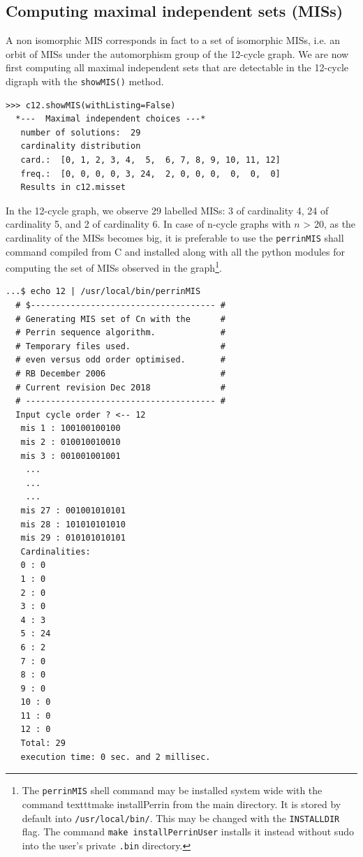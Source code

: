\subsection{Computing maximal independent sets (MISs)}
\label{sec:21.7.1}

A non isomorphic MIS corresponds in fact to a set of isomorphic MISs, i.e. an orbit of MISs under the automorphism group of the 12-cycle graph. We are now first computing all maximal independent sets that are detectable in the 12-cycle digraph with the \texttt{showMIS()} method.
\begin{lstlisting}
>>> c12.showMIS(withListing=False)
  *---  Maximal independent choices ---*
   number of solutions:  29
   cardinality distribution
   card.:  [0, 1, 2, 3, 4,  5,  6, 7, 8, 9, 10, 11, 12]
   freq.:  [0, 0, 0, 0, 3, 24,  2, 0, 0, 0,  0,  0,  0]
   Results in c12.misset
\end{lstlisting}
In the 12-cycle graph, we observe 29 labelled MISs: 3 of cardinality 4, 24 of cardinality 5, and 2  of cardinality 6. In case of n-cycle graphs with $n$ > 20, as the cardinality of the MISs becomes big, it is preferable to use the \texttt{perrinMIS} shall command compiled from C and installed  along with all the \Digraph python modules for computing the set of MISs observed in the graph\footnote{The \texttt{perrinMIS} shell command may be installed system wide with the command texttt{make installPerrin} from the main \Digraph directory. It is stored by default into \texttt{/usr/local/bin/}. This may be changed with the \texttt{INSTALLDIR} flag. The command \texttt{make installPerrinUser} installs it instead without sudo into the user's private \texttt{.bin} directory.}.
\begin{lstlisting}
...$ echo 12 | /usr/local/bin/perrinMIS
  # $------------------------------------- #
  # Generating MIS set of Cn with the      #
  # Perrin sequence algorithm.             #
  # Temporary files used.                  #
  # even versus odd order optimised.       #
  # RB December 2006                       #
  # Current revision Dec 2018              #
  # -------------------------------------- #
  Input cycle order ? <-- 12
   mis 1 : 100100100100
   mis 2 : 010010010010
   mis 3 : 001001001001
    ...
    ...
    ...
   mis 27 : 001001010101
   mis 28 : 101010101010
   mis 29 : 010101010101
   Cardinalities:
   0 : 0
   1 : 0
   2 : 0
   3 : 0
   4 : 3
   5 : 24
   6 : 2
   7 : 0
   8 : 0
   9 : 0
   10 : 0
   11 : 0
   12 : 0
   Total: 29
   execution time: 0 sec. and 2 millisec.
\end{lstlisting}
